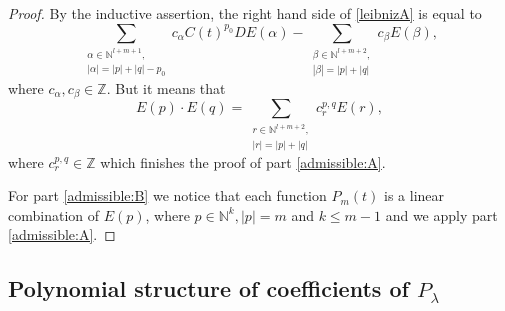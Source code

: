 \documentclass[12pt]{amsart}
\theoremstyle{plain}
\theoremstyle{remark}
\newcommand{\N}{\mathbb{N}}
\newcommand{\Z}{\mathbb{Z}}
\begin{document}
\begin{proof}
By the inductive assertion, the right hand side of \eqref{leibnizA} is equal to
$$\sum_{\substack{\alpha \in \N^{l+m+1}, \\ |\alpha| = |p|+|q|-p_0}} c_\alpha
C(t)^{p_0} D
E(\alpha) - \sum_{\substack{ \beta \in \N^{l+m+2}, \\|\beta| = |p|+|q|}}c_\beta
E(\beta),$$ 
where $c_\alpha,c_\beta \in \Z$. But it means that
$$E(p)\cdot E(q) = \sum_{\substack{r \in \N^{l+m+2}, \\|r| = |p|+|q|}} c^{p,q}_r
E(r),$$
where $c^{p,q}_r \in \Z$ which finishes the proof of part \ref{admissible:A}.

For part \ref{admissible:B} we notice that each function $P_m(t)$ is a linear
combination of $E(p)$, where $p \in \N^k, |p| = m$ and $k \leq m-1$ and we apply
part
\ref{admissible:A}.
\end{proof}

\subsection{Polynomial structure of coefficients of $P_\lambda$}
\end{document}
